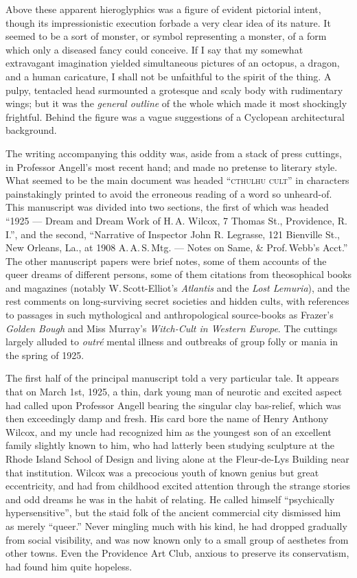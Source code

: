 Above these apparent hieroglyphics was a figure of evident pictorial
intent, though its impressionistic execution forbade a very clear idea
of its nature. It seemed to be a sort of monster, or symbol representing
a monster, of a form which only a diseased fancy could conceive. If I
say that my somewhat extravagant imagination yielded simultaneous
pictures of an octopus, a dragon, and a human caricature, I shall not be
unfaithful to the spirit of the thing. A pulpy, tentacled head
surmounted a grotesque and scaly body with rudimentary wings; but it was
the \emph{general outline} of the whole which made it most shockingly
frightful. Behind the figure was a vague suggestions of a Cyclopean
architectural background.

The writing accompanying this oddity was, aside from a stack of press
cuttings, in Professor Angell's most recent hand; and made no pretense
to literary style. What seemed to be the main document was headed
``\textsc{cthulhu cult}'' in characters painstakingly printed to avoid the
erroneous reading of a word so unheard-of. This manuscript was divided
into two sections, the first of which was headed ``1925 --- Dream
and Dream Work of H.\,A. Wilcox, 7 Thomas St., Providence, R.\,I.'', and the
second, ``Narrative of Inspector John R. Legrasse, 121 Bienville St.,
New Orleans, La., at 1908 A.\,A.\,S.\,Mtg. --- Notes on Same, \& Prof.\,Webb's
Acct.'' The other manuscript papers were brief notes, some of them
accounts of the queer dreams of different persons, some of them
citations from theosophical books and magazines (notably W.\,Scott-Elliot's \emph{Atlantis} and the \emph{Lost Lemuria}), and the rest comments on
long-surviving secret societies and hidden cults, with references to
passages in such mythological and anthropological source-books as
Frazer's \emph{Golden Bough} and Miss Murray's \emph{Witch-Cult in Western Europe}.
The cuttings largely alluded to \emph{outré} mental illness and outbreaks of
group folly or mania in the spring of 1925.

The first half of the principal manuscript told a very particular tale.
It appears that on March 1st, 1925, a thin, dark young man of neurotic
and excited aspect had called upon Professor Angell bearing the singular
clay bas-relief, which was then exceedingly damp and fresh. His card
bore the name of Henry Anthony Wilcox, and my uncle had recognized him
as the youngest son of an excellent family slightly known to him, who
had latterly been studying sculpture at the Rhode Island School of
Design and living alone at the Fleur-de-Lys Building near that
institution. Wilcox was a precocious youth of known genius but great
eccentricity, and had from childhood excited attention through the
strange stories and odd dreams he was in the habit of relating. He
called himself ``psychically hypersensitive'', but the staid folk of the
ancient commercial city dismissed him as merely ``queer.'' Never
mingling much with his kind, he had dropped gradually from social
visibility, and was now known only to a small group of aesthetes from
other towns. Even the Providence Art Club, anxious to preserve its
conservatism, had found him quite hopeless.

